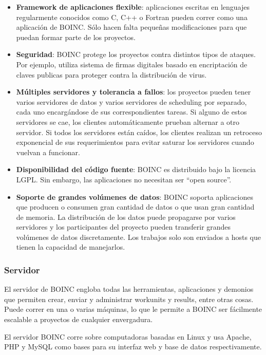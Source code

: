 \begin{itemize}
\item \textbf{Framework de aplicaciones flexible}: aplicaciones escritas en lenguajes regularmente conocidos como C, C++ o Fortran pueden correr como una aplicación de BOINC. Sólo hacen falta pequeñas modificaciones para que puedan formar parte de los proyectos.
\item \textbf{Seguridad}: BOINC protege los proyectos contra distintos tipos de ataques. Por ejemplo, utiliza sistema de firmas digitales basado en encriptación de claves publicas para proteger contra la distribución de virus.
\item \textbf{Múltiples servidores y tolerancia a fallos}:  los proyectos pueden tener varios servidores de datos y varios servidores de scheduling por separado, cada uno encargándose de sus correspondientes tareas. Si alguno de estos servidores se cae, los clientes automáticamente prueban alternar a otro servidor. Si todos los servidores están caídos, los clientes realizan un retroceso exponencial de sus requerimientos para evitar saturar los servidores cuando vuelvan a funcionar.
\item \textbf{Disponibilidad del código fuente}: BOINC es distribuido bajo la licencia LGPL. Sin embargo, las aplicaciones no necesitan ser “open source”.
\item \textbf{Soporte de grandes volúmenes de datos}: BOINC soporta aplicaciones que producen o consumen gran cantidad de datos o que usan gran cantidad de memoria. La distribución de los datos puede propagarse por varios servidores y los participantes del proyecto pueden transferir grandes volúmenes de datos discretamente. Los trabajos solo son enviados a hosts que tienen la capacidad de manejarlos.
\end{itemize}

\subsubsection{Servidor}

El servidor de BOINC engloba todas las herramientas, aplicaciones y demonios que permiten crear, enviar y administrar workunits y results, entre otras cosas. Puede correr en una o varias máquinas, lo que le permite a BOINC ser fácilmente escalable a proyectos de cualquier envergadura. 

El servidor BOINC corre sobre computadoras basadas en Linux y usa Apache, PHP y MySQL como bases para su interfaz web y base de datos respectivamente.

